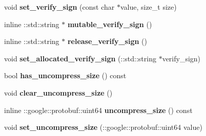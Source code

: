 \begin{DoxyCompactItemize}
void {\bfseries set\+\_\+verify\+\_\+sign} (const char $\ast$value, size\+\_\+t size)
\item 
\mbox{\label{classruntime_1_1FileSendProtos_a16dfe31869ab3b41bb48abfa405712b9}} 
inline \+::std\+::string $\ast$ {\bfseries mutable\+\_\+verify\+\_\+sign} ()
\item 
\mbox{\label{classruntime_1_1FileSendProtos_a983977b4a5d371a7885e47797b1abc30}} 
inline \+::std\+::string $\ast$ {\bfseries release\+\_\+verify\+\_\+sign} ()
\item 
\mbox{\label{classruntime_1_1FileSendProtos_acd8b01f75357e4e626e819df4b5cb600}} 
void {\bfseries set\+\_\+allocated\+\_\+verify\+\_\+sign} (\+::std\+::string $\ast$verify\+\_\+sign)
\item 
\mbox{\label{classruntime_1_1FileSendProtos_af145d6b6d615fbbc2298d568f7588276}} 
bool {\bfseries has\+\_\+uncompress\+\_\+size} () const
\item 
\mbox{\label{classruntime_1_1FileSendProtos_a4d4c597f88eb52b0ba78d85ad852f3ac}} 
void {\bfseries clear\+\_\+uncompress\+\_\+size} ()
\item 
\mbox{\label{classruntime_1_1FileSendProtos_a5f49cc7c4d19956b4a348205dc704aaa}} 
inline \+::google\+::protobuf\+::uint64 {\bfseries uncompress\+\_\+size} () const
\item 
\mbox{\label{classruntime_1_1FileSendProtos_a683d0a4f693b4997c9f59f61ec62fdd2}} 
void {\bfseries set\+\_\+uncompress\+\_\+size} (\+::google\+::protobuf\+::uint64 value)
\end{DoxyCompactItemize}
